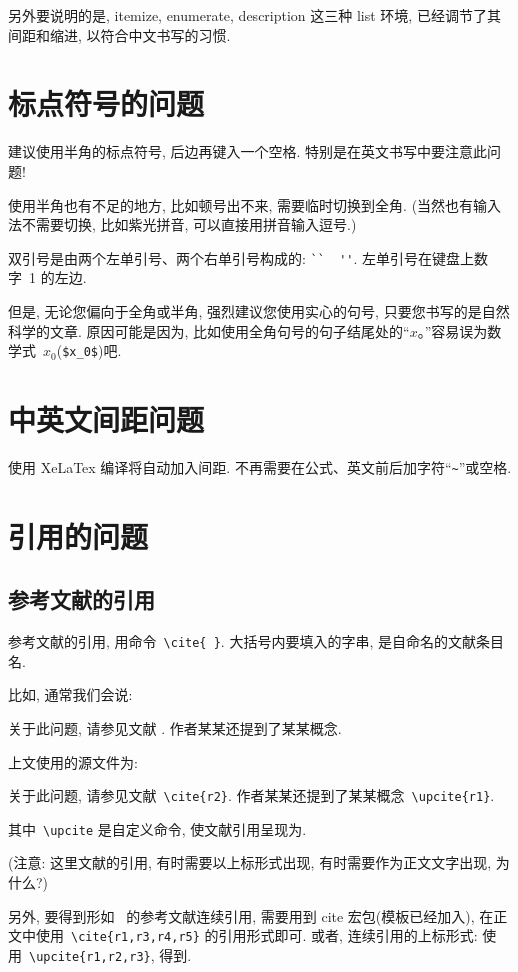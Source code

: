 \documentclass{WHUPhd}  %
\begin{document}
另外要说明的是,  itemize, enumerate, description 这三种 list 环境, 已经调节了其间距和缩进,
以符合中文书写的习惯.

\section{标点符号的问题}

建议使用半角的标点符号, 后边再键入一个空格. 特别是在英文书写中要注意此问题!

使用半角也有不足的地方, 比如顿号出不来, 需要临时切换到全角. (当然也有输入法不需要切换, 比如紫光拼音, 可以直接用拼音输入逗号.)

双引号是由两个左单引号、两个右单引号构成的: \verb|``  ''|. 左单引号在键盘上数字~1 的左边.

但是, 无论您偏向于全角或半角, 强烈建议您使用实心的句号, 只要您书写的是自然科学的文章.
原因可能是因为, 比如使用全角句号的句子结尾处的``$x$。''容易误为数学式~$x_0$(\verb|$x_0$|)吧.

\section{中英文间距问题}

使用 XeLaTex 编译将自动加入间距. 不再需要在公式、英文前后加字符``\verb|~|''或空格.

\section{引用的问题}


\subsection{参考文献的引用}

参考文献的引用, 用命令~\verb|\cite{ }|. 大括号内要填入的字串, 是自命名的文献条目名.

比如, 通常我们会说:

 {\kaishu
关于此问题, 请参见文献 \cite{r2}. 作者某某还提到了某某概念.}


上文使用的源文件为:

 {\kaishu
关于此问题, 请参见文献~\verb|\cite{r2}|. 作者某某还提到了某某概念~\verb|\upcite{r1}|.
}

其中~\verb|\upcite| 是自定义命令, 使文献引用呈现为.

({\heiti 注意:} {\kaishu 这里文献的引用, 有时需要以上标形式出现, 有时需要作为正文文字出现, 为什么?})

另外, 要得到形如~\cite{r1,r3,r4,r5} 的参考文献连续引用, 需要用到 cite 宏包(模板已经加入),
在正文中使用~\verb|\cite{r1,r3,r4,r5}| 的引用形式即可.
或者, 连续引用的上标形式: 使用~\verb|\upcite{r1,r2,r3}|, 得到.
\end{document}
